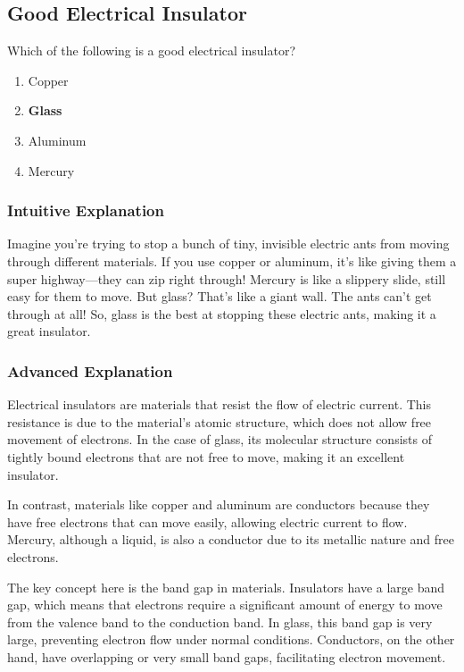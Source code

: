 \subsection{Good Electrical Insulator}
\label{T5A08}

\begin{tcolorbox}[colback=gray!10!white,colframe=black!75!black,title=T5A08]
Which of the following is a good electrical insulator?
\begin{enumerate}[label=\Alph*)]
    \item Copper
    \item \textbf{Glass}
    \item Aluminum
    \item Mercury
\end{enumerate}
\end{tcolorbox}

\subsubsection{Intuitive Explanation}
Imagine you're trying to stop a bunch of tiny, invisible electric ants from moving through different materials. If you use copper or aluminum, it's like giving them a super highway—they can zip right through! Mercury is like a slippery slide, still easy for them to move. But glass? That's like a giant wall. The ants can't get through at all! So, glass is the best at stopping these electric ants, making it a great insulator.

\subsubsection{Advanced Explanation}
Electrical insulators are materials that resist the flow of electric current. This resistance is due to the material's atomic structure, which does not allow free movement of electrons. In the case of glass, its molecular structure consists of tightly bound electrons that are not free to move, making it an excellent insulator. 

In contrast, materials like copper and aluminum are conductors because they have free electrons that can move easily, allowing electric current to flow. Mercury, although a liquid, is also a conductor due to its metallic nature and free electrons. 

The key concept here is the band gap in materials. Insulators have a large band gap, which means that electrons require a significant amount of energy to move from the valence band to the conduction band. In glass, this band gap is very large, preventing electron flow under normal conditions. Conductors, on the other hand, have overlapping or very small band gaps, facilitating electron movement.

